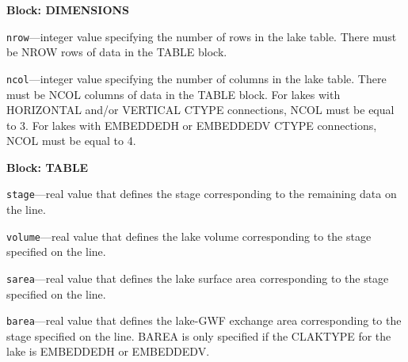
\item \textbf{Block: DIMENSIONS}

\begin{description}
\item \texttt{nrow}---integer value specifying the number of rows in the lake table. There must be NROW rows of data in the TABLE block.

\item \texttt{ncol}---integer value specifying the number of columns in the lake table. There must be NCOL columns of data in the TABLE block. For lakes with HORIZONTAL and/or VERTICAL CTYPE connections, NCOL must be equal to 3. For lakes with EMBEDDEDH or EMBEDDEDV CTYPE connections, NCOL must be equal to 4.

\end{description}
\item \textbf{Block: TABLE}

\begin{description}
\item \texttt{stage}---real value that defines the stage corresponding to the remaining data on the line.

\item \texttt{volume}---real value that defines the lake volume corresponding to the stage specified on the line.

\item \texttt{sarea}---real value that defines the lake surface area corresponding to the stage specified on the line.

\item \texttt{barea}---real value that defines the lake-GWF exchange area corresponding to the stage specified on the line. BAREA is only specified if the CLAKTYPE for the lake is EMBEDDEDH or EMBEDDEDV.

\end{description}

